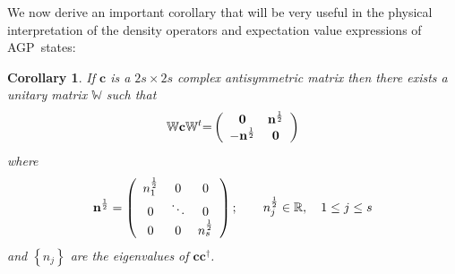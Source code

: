 \documentclass[aps,preprint]{revtex4}%
\newtheorem{corollary}[theorem]{Corollary}
\begin{document}
We now derive an important corollary that will be very useful in the physical
interpretation of the density operators and expectation value expressions of AGP\ states:

\begin{corollary}
If $\mathbf{c}$ is a $2s\times2s$ complex antisymmetric matrix then there
exists a unitary matrix $\mathbb{W}$ such that
\begin{equation}
\mathbb{W}\mathbf{c}\mathbb{W}^{t}\mathbb{=}\left(
\begin{array}
[c]{cc}%
\mathbf{0} & \mathbf{n}^{\frac{1}{2}}\\
-\mathbf{n}^{\frac{1}{2}} & \mathbf{0}%
\end{array}
\right)
\end{equation}
where
\begin{equation}
\mathbf{n}^{\frac{1}{2}}=\left(
\begin{array}
[c]{ccc}%
n_{1}^{\frac{1}{2}} & 0 & 0\\
0 & \ddots & 0\\
0 & 0 & n_{s}^{\frac{1}{2}}%
\end{array}
\right)  ;\qquad n_{j}^{\frac{1}{2}}\in\mathbb{R},\quad1\leq j\leq s
\end{equation}
and $\left\{  n_{j}\right\}  $ are the eigenvalues of $\mathbf{cc}^{\dagger}$.
\end{corollary}
\end{document}
